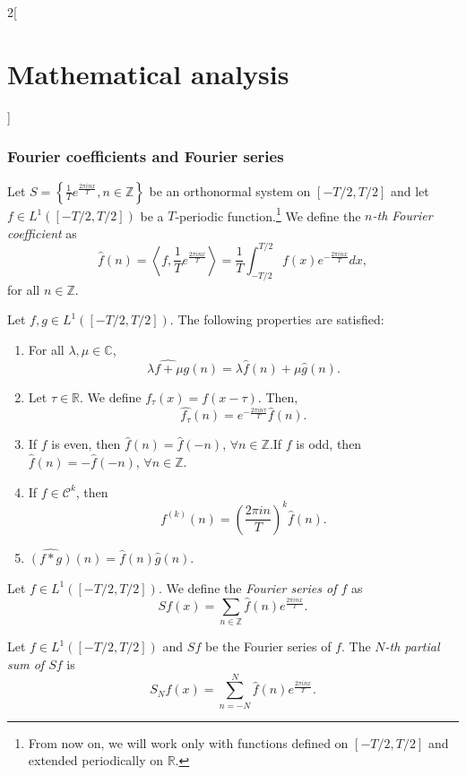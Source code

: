 \documentclass[class=article,crop=false]{standalone}
\begin{document}
\begin{multicols}{2}[\section{Mathematical analysis}]
\subsubsection*{Fourier coefficients and Fourier series}
\begin{definition}
Let $\displaystyle S=\left\{\frac{1}{T}e^{\frac{2\pi inx}{T}},n\in\mathbb{Z}\right\}$ be an orthonormal system on $[-T/2,T/2]$ and let $f\in L^1([-T/2,T/2])$ be a $T$-periodic function.\footnote{From now on, we will work only with functions defined on $[-T/2,T/2]$ and extended periodically on $\mathbb{R}$.} We define the \textit{$n$-th Fourier coefficient} as $$\widehat{f}(n)=\left\langle f,\frac{1}{T}e^{\frac{2\pi inx}{T}}\right\rangle=\frac{1}{T}\int_{-T/2}^{T/2}f(x)e^{-\frac{2\pi inx}{T}}dx,$$ for all $n\in\mathbb{Z}$.
\end{definition}
\begin{prop}
Let $f,g\in L^1([-T/2,T/2])$. The following properties are satisfied:
\begin{enumerate}
    \item For all $\lambda,\mu\in\mathbb{C}$, $$\widehat{\lambda f+\mu g}(n)=\lambda\widehat{f}(n)+\mu\widehat{g}(n).$$
    \item Let $\tau\in\mathbb{R}$. We define $f_\tau(x)=f(x-\tau)$. Then, $$\widehat{f_\tau}(n)=e^{-\frac{2\pi in\tau}{T}}\widehat{f}(n).$$
    \item If $f$ is even, then $\widehat{f}(n)=\widehat{f}(-n)$, $\forall n\in\mathbb{Z}$.\newline If $f$ is odd, then $\widehat{f}(n)=-\widehat{f}(-n)$, $\forall n\in\mathbb{Z}$. 
    \item If $f\in \mathcal{C}^k$, then $$\widehat{f^{(k)}}(n)=\left(\frac{2\pi in}{T}\right)^k\widehat{f}(n).$$
    \item $\widehat{(f*g)}(n)=\widehat{f}(n)\widehat{g}(n)$.
\end{enumerate}
\end{prop}
\begin{definition}
Let $f\in L^1([-T/2,T/2])$. We define the \textit{Fourier series of $f$} as $$\displaystyle Sf(x)=\sum_{n\in\mathbb{Z}}\widehat{f}(n)e^{\frac{2\pi inx}{T}}.$$
\end{definition}
\begin{definition}
Let $f\in L^1([-T/2,T/2])$ and $Sf$ be the Fourier series of $f$. The \textit{$N$-th partial sum of $Sf$} is $$S_Nf(x)=\sum_{n=-N}^N\widehat{f}(n)e^{\frac{2\pi inx}{T}}.$$
\end{definition}
\begin{prop}

\end{prop}
\end{multicols}
\end{document}
